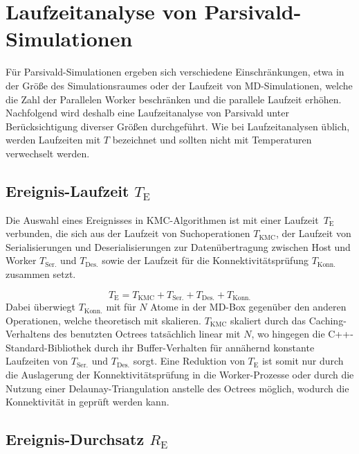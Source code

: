 \section{Laufzeitanalyse von Parsivald-Simulationen}
\label{runtime}

Für Parsivald-Simulationen ergeben sich verschiedene Einschränkungen, etwa in der Größe des Simulationsraumes oder der Laufzeit von MD-Simulationen, welche die Zahl der Parallelen Worker beschränken und die parallele Laufzeit erhöhen.
Nachfolgend wird deshalb eine Laufzeitanalyse von Parsivald unter Berücksichtigung diverser Größen durchgeführt.
Wie bei Laufzeitanalysen üblich, werden Laufzeiten mit $T$ bezeichnet und sollten nicht mit Temperaturen verwechselt werden.

\subsection{Ereignis-Laufzeit $T_\text{E}$}

Die Auswahl eines Ereignisses in KMC-Algorithmen ist mit einer Laufzeit~$T_\text{E}$ verbunden, die sich aus der Laufzeit von Suchoperationen $T_\text{KMC}$, der Laufzeit von Serialisierungen und Deserialisierungen zur Datenübertragung zwischen Host und Worker $T_\text{Ser.}$ und $T_\text{Des.}$ sowie der Laufzeit für die Konnektivitätsprüfung $T_\text{Konn.}$ zusammen setzt.

\begin{equation}
T_\text{E} = T_\text{KMC} + T_\text{Ser.} + T_\text{Des.} + T_\text{Konn.}
\end{equation}
Dabei überwiegt $T_\text{Konn.}$ mit  für $N$ Atome in der MD-Box gegenüber den anderen Operationen, welche theoretisch mit  skalieren.
$T_\text{KMC}$ skaliert durch das Caching-Verhaltens des benutzten Octrees tatsächlich linear mit $N$, wo hingegen die C++-Standard-Bibliothek durch ihr Buffer-Verhalten für annähernd konstante Laufzeiten von $T_\text{Ser.}$ und $T_\text{Des.}$ sorgt.
Eine Reduktion von $T_\text{E}$ ist somit nur durch die Auslagerung der Konnektivitätsprüfung in die Worker-Prozesse oder durch die Nutzung einer Delaunay-Triangulation anstelle des Octrees möglich, wodurch die Konnektivität in  geprüft werden kann.

\subsection{Ereignis-Durchsatz $R_\text{E}$}

